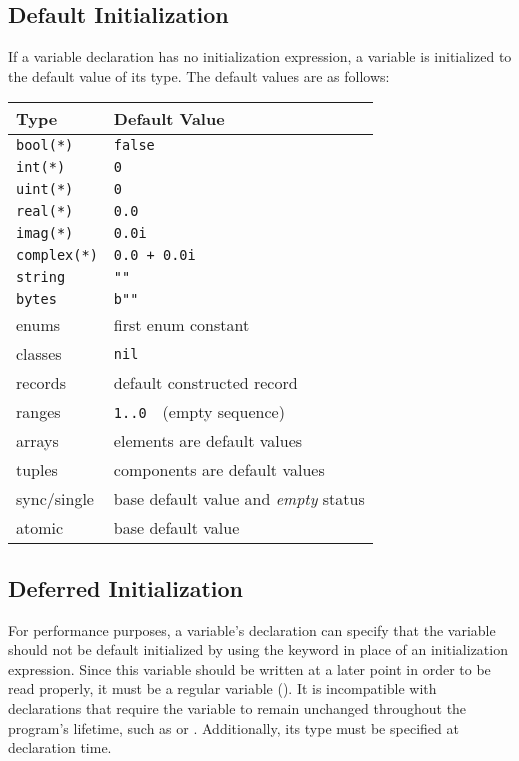 \subsection{Default Initialization}
\label{Default_Values_For_Types}

If a variable declaration has no initialization expression, a variable
is initialized to the default value of its type.  The default values
are as follows:
\begin{center}
\begin{tabular}{|l|l|}
\hline
{\bf Type} & {\bf Default Value} \\
\hline
{\tt bool(*)} & {\tt false} \\
{\tt int(*)} & {\tt 0} \\
{\tt uint(*)} & {\tt 0} \\
{\tt real(*)} & {\tt 0.0} \\
{\tt imag(*)} & {\tt 0.0i} \\
{\tt complex(*)} & {\tt 0.0 + 0.0i} \\
{\tt string} & {\tt ""} \\
{\tt bytes} & {\tt b""} \\
enums & first enum constant \\
classes & {\tt nil} \\
records & default constructed record \\
ranges & {\tt 1..0} $ $ $ $ (empty sequence) \\
arrays & elements are default values \\
tuples & components are default values \\
sync/single & base default value and \emph{empty} status \\
atomic & base default value \\
\hline
\end{tabular}
\end{center}

\subsection{Deferred Initialization}
\label{Noinit_Capability}

For performance purposes, a variable's declaration can specify that
the variable should not be default initialized by using
the  keyword in place of an initialization expression.
Since this variable should be written at a later point in order to be
read properly, it must be a regular variable ().  It is
incompatible with declarations that require the variable to remain
unchanged throughout the program's lifetime, such as 
or .  Additionally, its type must be specified at
declaration time.

